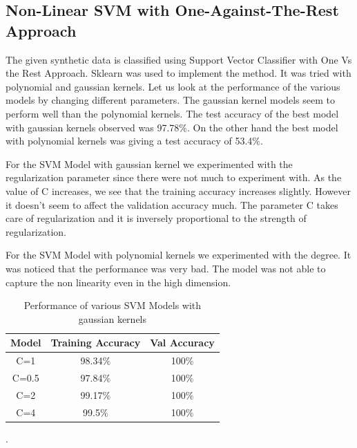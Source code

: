 \subsection{Non-Linear SVM with One-Against-The-Rest Approach}


The given synthetic data is classified using Support Vector Classifier with One Vs the Rest Approach. Sklearn was used to implement the method. It was tried with polynomial and gaussian kernels. Let us look at the performance of the various models by changing different parameters. The gaussian kernel models seem to perform well than the polynomial kernels. The test accuracy of the best model with gaussian kernels observed was 97.78$\%$. On the other hand the best model with polynomial kernels was giving a test accuracy of 53.4$\%$.

For the SVM Model with gaussian kernel we experimented with the regularization parameter since there were not much to experiment with. As the value of C increases, we see that the training accuracy increases slightly. However it doesn't seem to affect the validation accuracy much. The parameter C takes care of regularization and it is inversely proportional to the strength of regularization. 

For the SVM Model with polynomial kernels we experimented with the degree. It was noticed that the performance was very bad. The model was not able to capture the non linearity even in the high dimension. 

{
\begin{table}[!h]
\centering
\begin{tabular}{ |c|c|c|  }
\hline
\rowcolor{lightgray} Model & Training Accuracy & Val Accuracy\\
\hline
C=1 & 98.34$\%$  & 100$\%$  \\ 
\hline
C=0.5 & 97.84$\%$  & 100$\%$  \\ 
\hline
C=2 & 99.17$\%$  & 100$\%$  \\ 
\hline
C=4 & 99.5$\%$  & 100$\%$  \\ 
\hline
\end{tabular}
\caption{Performance of various SVM Models with gaussian kernels}.
\label{table:3}
\end{table}
}

